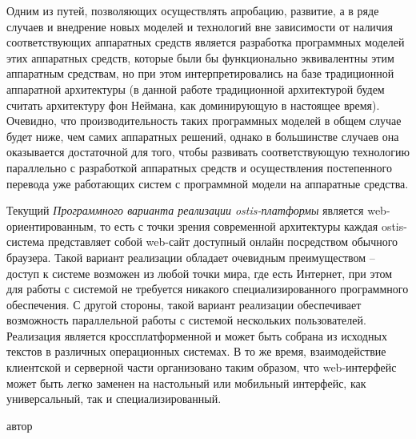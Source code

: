
Одним из путей, позволяющих осуществлять апробацию, развитие, а в ряде случаев и внедрение новых моделей и технологий
вне зависимости от наличия соответствующих аппаратных средств является разработка программных моделей этих аппаратных
средств, которые были бы функционально эквивалентны этим аппаратным средствам, но при этом интерпретировались на базе
традиционной аппаратной архитектуры (в данной работе традиционной архитектурой будем считать архитектуру фон Неймана,
как доминирующую в настоящее время). Очевидно, что производительность таких программных моделей в общем случае будет
ниже, чем самих аппаратных решений, однако в большинстве случаев она оказывается достаточной для того, чтобы развивать
соответствующую технологию параллельно с разработкой аппаратных средств и осуществления постепенного перевода уже
работающих систем с программной модели на аппаратные средства.


Текущий \textit{Программного варианта реализации ostis-платформы} является web-ориентированным, то есть с точки зрения
современной архитектуры каждая \mbox{ostis-система} представляет собой web-сайт доступный онлайн посредством обычного браузера.
Такой вариант реализации обладает очевидным преимуществом --
доступ к системе возможен из любой точки мира, где есть Интернет, при этом для работы с системой не требуется никакого
специализированного программного обеспечения. С другой стороны, такой вариант реализации обеспечивает возможность
параллельной работы с системой нескольких пользователей. Реализация является кроссплатформенной и может быть собрана
из исходных текстов в различных операционных системах. В то же время, взаимодействие клиентской и серверной части
организовано таким образом, что \mbox{web-интерфейс} может быть легко заменен на настольный или мобильный интерфейс, как
универсальный, так и специализированный.

\begin{SCn}
\begin{scnindent}
\end{scnindent}
\begin{scnrelfromlist}{автор}
\end{scnrelfromlist}
\end{SCn}

